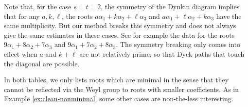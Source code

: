 \documentclass{amsart}
\numberwithin{equation}{section}
\numberwithin{figure}{section}
\numberwithin{table}{section}
\theoremstyle{definition}
\begin{document}
Note that, for the case $s=t=2$, the symmetry of the Dynkin diagram implies that for any $a,k,\ell$, the roots $a\alpha_1+k \alpha_2+\ell \alpha_3$  and $a\alpha_1+\ell \alpha_2+k \alpha_3$  have the same multiplicity. But our method breaks this symmetry and does not always give the same estimates in these cases. See for example the data for the roots $9\alpha_1+8\alpha_2+7\alpha_3$ and $9\alpha_1+7\alpha_2+8\alpha_3$. The symmetry breaking only comes into effect when $a$ and $k+\ell$ are not relatively prime, so that Dyck paths that touch the diagonal are possible.%

In both tables, we only lists roots which are minimal in the sense that they cannot be reflected via the Weyl group to roots with smaller coefficients. As in Example \ref{ex:clean-nonminimal} some other cases are non-the-less interesting.
\end{document}
